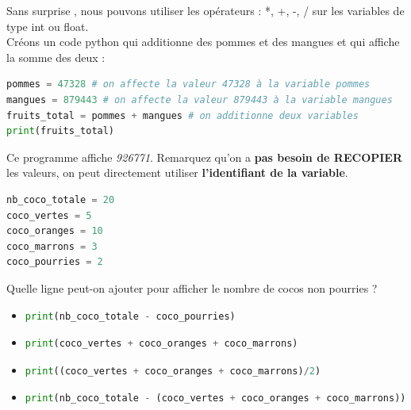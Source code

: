 Sans surprise , nous pouvons utiliser les opérateurs : *, +, -, / sur les variables de type int ou float.\\

Créons un code python qui additionne des pommes et des mangues et qui affiche la somme des deux :


\begin{lstlisting}[style=pythonstyle, language=Python]
pommes = 47328 # on affecte la valeur 47328 à la variable pommes
mangues = 879443 # on affecte la valeur 879443 à la variable mangues
fruits_total = pommes + mangues # on additionne deux variables
print(fruits_total)
\end{lstlisting}
Ce programme affiche \textit{926771}. Remarquez qu'on a \textbf{pas besoin de RECOPIER} les valeurs, on peut directement utiliser \textbf{l'identifiant de la variable}.
\newpage
\begin{Quizz}
    \begin{lstlisting}[style=pythonstyle, language=Python]
nb_coco_totale = 20
coco_vertes = 5
coco_oranges = 10
coco_marrons = 3
coco_pourries = 2 \end{lstlisting}

    Quelle ligne peut-on ajouter pour afficher le nombre de cocos non pourries ?
    \begin{itemize}
    \renewcommand{\labelitemi}{$\square$}
    \item  \begin{lstlisting}[style=pythonstyle, language=Python]
print(nb_coco_totale - coco_pourries)\end{lstlisting}

    \item \begin{lstlisting}[style=pythonstyle, language=Python]
print(coco_vertes + coco_oranges + coco_marrons)\end{lstlisting}

    \item \begin{lstlisting}[style=pythonstyle, language=Python]
print((coco_vertes + coco_oranges + coco_marrons)/2)\end{lstlisting}

    \item  \begin{lstlisting}[style=pythonstyle, language=Python]
print(nb_coco_totale - (coco_vertes + coco_oranges + coco_marrons))\end{lstlisting}
    \end{itemize}
\end{Quizz}

